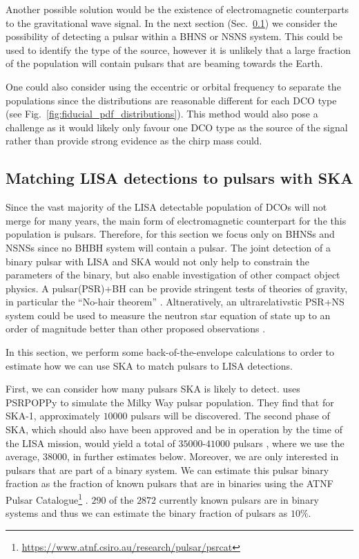 Another possible solution would be the existence of electromagnetic counterparts to the gravitational wave signal. In the next section (Sec.~\ref{sec:pulsar_matching}) we consider the possibility of detecting a pulsar within a BHNS or NSNS system. This could be used to identify the type of the source, however it is unlikely that a large fraction of the population will contain pulsars that are beaming towards the Earth.

One could also consider using the eccentric or orbital frequency to separate the populations since the distributions are reasonable different for each DCO type (see Fig.~\ref{fig:fiducial_pdf_distributions}). This method would also pose a challenge as it would likely only favour one DCO type as the source of the signal rather than provide strong evidence as the chirp mass could.

\subsection{Matching LISA detections to pulsars with SKA}\label{sec:pulsar_matching}
Since the vast majority of the LISA detectable population of DCOs will not merge for many years, the main form of electromagnetic counterpart for the this population is pulsars. Therefore, for this section we focus only on BHNSs and NSNSs since no BHBH system will contain a pulsar. The joint detection of a binary pulsar with LISA and SKA would not only help to constrain the parameters of the binary, but also enable investigation of other compact object physics. A pulsar(PSR)+BH can be provide stringent tests of theories of gravity, in particular the ``No-hair theorem'' \citep{Keane+2015}. Altneratively, an ultrarelativstic PSR+NS system could be used to measure the neutron star equation of state up to an order of magnitude better than other proposed observations \citep{Kyutoku+2019, Thrane+2020}.

In this section, we perform some back-of-the-envelope calculations to order to estimate how we can use SKA to match pulsars to LISA detections.

First, we can consider how many pulsars SKA is likely to detect. \citet{Keane+2015} uses PSRPOPPy \citep{Bates+2014} to simulate the Milky Way pulsar population. They find that for SKA-1, approximately $10000$ pulsars will be discovered. The second phase of SKA, which should also have been approved and be in operation by the time of the LISA mission, would yield a total of $35000$-$41000$ pulsars \citep{Keane+2015}, where we use the average, $38000$, in further estimates below. Moreover, we are only interested in pulsars that are part of a binary system. We can estimate this pulsar binary fraction as the fraction of known pulsars that are in binaries using the ATNF Pulsar Catalogue\footnote{\url{https://www.atnf.csiro.au/research/pulsar/psrcat}} \citep{Manchester+2005}. $290$ of the $2872$ currently known pulsars are in binary systems and thus we can estimate the binary fraction of pulsars as $10\%$.


